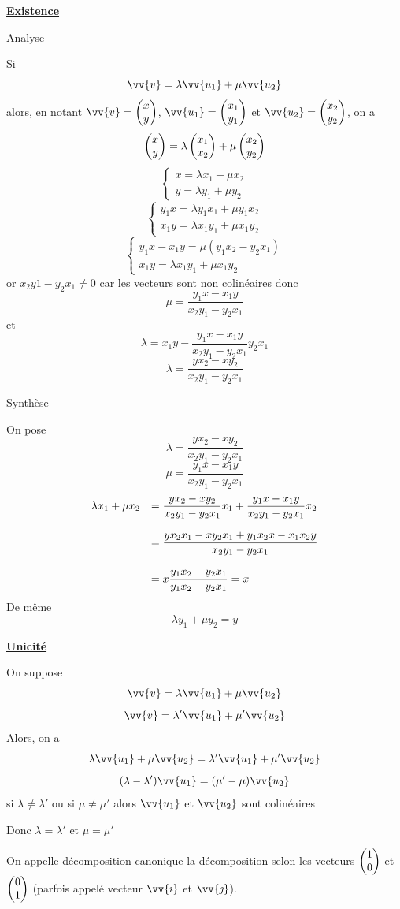\begin{preuve}
\textbf{\underline{Existence}}\newline

\underline{Analyse}\newline


Si $$\vv{v} = \lambda\vv{u_1} + \mu \vv{u_2}$$
alors, en notant $\vv{v} = \covec{x}{y}$, $\vv{u_1} = \covec{x_1}{y_1}$ et $\vv{u_2} = \covec{x_2}{y_2}$, on a 
$$\begin{pmatrix}x \\y \end{pmatrix} = \lambda \begin{pmatrix}x_1 \\x_2 \end{pmatrix} + \mu \begin{pmatrix}x_2 \\y_2 \end{pmatrix}$$
$$\left\{ \begin{array}{l} x = \lambda x_1 + \mu x_2 \\ y = \lambda y_1 + \mu y_2 \end{array} \right.$$
$$\left\{ \begin{array}{l} y_1x = \lambda y_1x_1 + \mu y_1x_2 \\ x_1y = \lambda x_1y_1 + \mu x_1y_2 \end{array} \right.$$
$$\left\{ \begin{array}{l} y_1x-x_1y =\mu(y_1x_2 - y_2x_1) \\ x_1y = \lambda x_1y_1 + \mu x_1y_2 \end{array} \right.$$
or $x_2y1-y_2x_1 \neq 0$ car les vecteurs sont non colinéaires donc 
$$\mu = \dfrac{y_1x - x_1y}{x_2y_1 - y_2x_1}$$
et 
$$\lambda = x_1y - \dfrac{y_1x - x_1y}{x_2y_1 - y_2x_1}y_2x_1$$
$$\lambda = \dfrac{yx_2 - xy_2}{x_2y_1 - y_2x_1}$$

\underline{Synthèse}\newline


On pose 
$$\lambda = \dfrac{yx_2 - xy_2}{x_2y_1 - y_2x_1}$$
$$\mu = \dfrac{y_1x - x_1y}{x_2y_1 - y_2x_1}$$
$$
\begin{array}{l l}
\lambda x_1 + \mu x_2 &= \dfrac{yx_2 - xy_2}{x_2y_1 - y_2x_1} x_1 + \dfrac{y_1x - x_1y}{x_2y_1 - y_2x_1} x_2\\
\\
& = \dfrac{yx_2x_1 - xy_2x_1 + y_1x_2x-x_1x_2y}{x_2y_1-y_2x_1}\\
\\
& = x\dfrac{y_1x_2 - y_2x_1}{y_1x_2-y_2x_1} = x\\
\end{array}
$$
De même 
$$\lambda y_1 + \mu y_2 = y$$


\textbf{\underline{Unicité}}\newline


On suppose 
$$\vv{v} = \lambda \vv{u_1} + \mu \vv{u_2}$$
$$\vv{v} = \lambda' \vv{u_1} + \mu' \vv{u_2}$$
Alors, on a
$$\lambda \vv{u_1} + \mu \vv{u_2} = \lambda' \vv{u_1} + \mu' \vv{u_2}$$
$$(\lambda - \lambda') \vv{u_1} = (\mu' - \mu) \vv{u_2}$$
si $\lambda \neq \lambda'$ ou si $\mu \neq \mu'$ alors $\vv{u_1}$ et $\vv{u_2}$ sont colinéaires\newline

Donc $\lambda = \lambda'$ et $\mu = \mu'$
\end{preuve}
On appelle décomposition canonique la décomposition selon les vecteurs $\begin{pmatrix}1 \\0 \end{pmatrix}$ et $\begin{pmatrix}0 \\1 \end{pmatrix}$ (parfois appelé vecteur $\vv{\imath}$ et $\vv{\jmath}$). \newline

